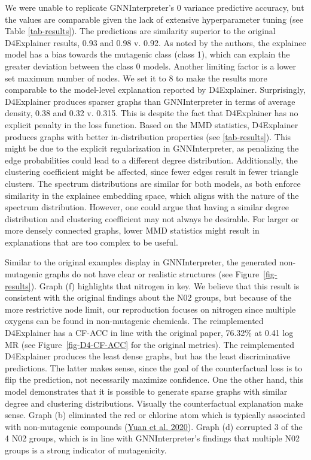 \documentclass[
  11pt,
  letterpaper,
]{article}
\begin{document}
\quad We were unable to replicate GNNInterpreter's 0 variance predictive
accuracy, but the values are comparable given the lack of extensive
hyperparameter tuning (see Table \ref{tab-results}). The predictions are
similarity superior to the original D4Explainer results, 0.93 and 0.98
v. 0.92. As noted by the authors, the explainee model has a bias towards
the mutagenic class (class 1), which can explain the greater deviation
between the class 0 models. Another limiting factor is a lower set
maximum number of nodes. We set it to 8 to make the results more
comparable to the model-level explanation reported by D4Explainer.
Surprisingly, D4Explainer produces sparser graphs than GNNInterpreter in
terms of average density, 0.38 and 0.32 v. 0.315. This is despite the
fact that D4Explainer has no explicit penalty in the loss function.
Based on the MMD statistics, D4Explainer produces graphs with better
in-distribution properties (see \ref{tab-results}). This might be due to
the explicit regularization in GNNInterpreter, as penalizing the edge
probabilities could lead to a different degree distribution.
Additionally, the clustering coefficient might be affected, since fewer
edges result in fewer triangle clusters. The spectrum distributions are
similar for both models, as both enforce similarity in the explainee
embedding space, which aligns with the nature of the spectrum
distribution. However, one could argue that having a similar degree
distribution and clustering coefficient may not always be desirable. For
larger or more densely connected graphs, lower MMD statistics might
result in explanations that are too complex to be useful.

\quad Similar to the original examples display in GNNInterpreter, the
generated non-mutagenic graphs do not have clear or realistic structures
(see Figure~\ref{fig-results}). Graph (f) highlights that nitrogen in
key. We believe that this result is consistent with the original
findings about the N02 groups, but because of the more restrictive node
limit, our reproduction focuses on nitrogen since multiple oxygens can
be found in non-mutagenic chemicals. The reimplemented D4Explainer has a
CF-ACC in line with the original paper, 76.32\% at 0.41 log MR (see
Figure~\ref{fig-D4-CF-ACC} for the original metrics). The reimplemented
D4Explainer produces the least dense graphs, but has the least
discriminative predictions. The latter makes sense, since the goal of
the counterfactual loss is to flip the prediction, not necessarily
maximize confidence. One the other hand, this model demonstrates that it
is possible to generate sparse graphs with similar degree and clustering
distributions. Visually the counterfactual explanation make sense. Graph
(b) eliminated the red or chlorine atom which is typically associated
with non-mutagenic compounds
(\protect\hyperlink{ref-Yuan_Tang_Hu_Ji_2020}{Yuan et al. 2020}). Graph
(d) corrupted 3 of the 4 N02 groups, which is in line with
GNNInterpreter's findings that multiple N02 groups is a strong indicator
of mutagenicity.
\end{document}
